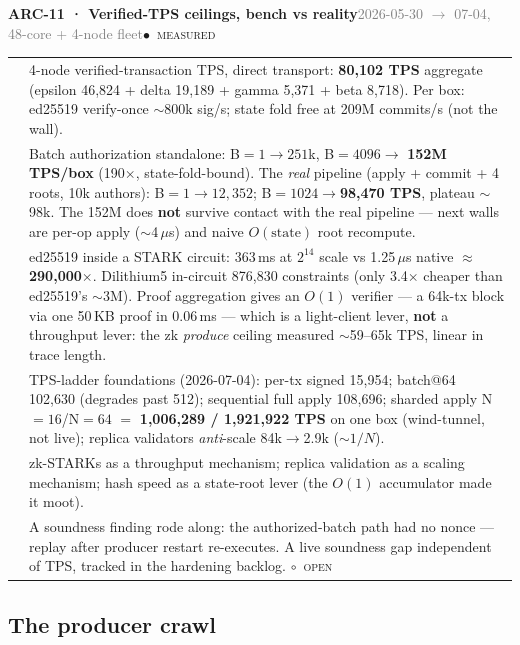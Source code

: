 \documentclass[10pt,a4paper]{article}
\makeatletter
\newcommand{\stM}{\textcolor{sigilcyan}{$\bullet$}~{\scriptsize\textcolor{sigilcyan}{\textsc{measured}}}}
\newcommand{\stO}{\textcolor{sigilamber}{$\circ$}~{\scriptsize\textcolor{sigilamber}{\textsc{open}}}}
\newcommand{\measured}[1]{\textcolor{sigilcyan}{\textbf{#1}}}
\newcommand{\frow}[2]{{\footnotesize\textcolor{gray}{\textsc{#1}}}\;&\small #2\\}
\newenvironment{mentry}[4]{%
\begin{tcolorbox}[enhanced,breakable,colback=white,colframe=slate,boxrule=0.6pt,arc=2pt,
  left=8pt,right=8pt,top=6pt,bottom=6pt,
  borderline west={3pt}{0pt}{sigilcyan!70!slate}]
{\small\textbf{#1 · #2}\hfill{\footnotesize\textcolor{gray}{#3}}\quad#4}\\[4pt]
\begin{tabular}{@{}>{\raggedleft\arraybackslash}p{1.8cm}p{13.2cm}@{}}
}{%
\end{tabular}
\end{tcolorbox}\vspace{2pt}}
\makeatother
\begin{document}
\begin{mentry}{ARC-11}{Verified-TPS ceilings, bench vs reality}{2026-05-30 $\to$ 07-04, 48-core + 4-node fleet}{\stM}
\frow{live}{4-node verified-transaction TPS, direct transport:
\measured{80{,}102 TPS} aggregate (epsilon 46{,}824 + delta 19{,}189 + gamma 5{,}371 +
beta 8{,}718). Per box: ed25519 verify-once $\sim$800k sig/s; state fold free at 209M
commits/s (not the wall).}
\frow{bench vs real}{Batch authorization standalone: B$=1\to251$k, B$=4096\to$
\measured{152M TPS/box} (190$\times$, state-fold-bound). The \emph{real} pipeline (apply +
commit + 4 roots, 10k authors): B$=1\to12{,}352$; B$=1024\to$\measured{98{,}470 TPS},
plateau $\sim$98k. The 152M does \textbf{not} survive contact with the real pipeline ---
next walls are per-op apply ($\sim$4\,$\mu$s) and naive $O(\mathrm{state})$ root recompute.}
\frow{zk tax}{ed25519 inside a STARK circuit: 363\,ms at $2^{14}$ scale vs 1.25\,$\mu$s
native $\approx$ \measured{290{,}000$\times$}. Dilithium5 in-circuit 876{,}830 constraints
(only 3.4$\times$ cheaper than ed25519's $\sim$3M). Proof aggregation gives an $O(1)$
verifier --- a 64k-tx block via one 50\,KB proof in 0.06\,ms --- which is a light-client
lever, \textbf{not} a throughput lever: the zk \emph{produce} ceiling measured
$\sim$59--65k TPS, linear in trace length.}
\frow{ladder}{TPS-ladder foundations (2026-07-04): per-tx signed 15{,}954; batch@64
102{,}630 (degrades past 512); sequential full apply 108{,}696; sharded apply
N$=16$/N$=64$ $=$ \measured{1{,}006{,}289 / 1{,}921{,}922 TPS} on one box (wind-tunnel,
not live); replica validators \emph{anti}-scale 84k$\to$2.9k ($\sim 1/N$).}
\frow{ruled out}{zk-STARKs as a throughput mechanism; replica validation as a scaling
mechanism; hash speed as a state-root lever (the $O(1)$ accumulator made it moot).}
\frow{open}{A soundness finding rode along: the authorized-batch path had no nonce ---
replay after producer restart re-executes. A live soundness gap independent of TPS,
tracked in the hardening backlog. \stO}
\end{mentry}

\subsection{The producer crawl}
\end{document}
